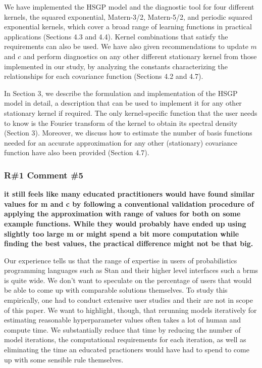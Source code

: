 \documentclass[11pt]{report}
\begin{document}
We have implemented the HSGP model and the diagnostic tool for four different kernels, the squared exponential, Matern-3/2, Matern-5/2, and periodic squared exponential kernels, which cover a broad range of learning functions in practical applications (Sections 4.3 and 4.4). Kernel combinations that satisfy the requirements can also be used. We have also given recommendations to update $m$ and $c$ and perform diagnostics on any other different stationary kernel from those implemented in our study, by analyzing the constants characterizing the relationships for each covariance function (Sections 4.2 and 4.7). 

In Section 3, we describe the formulation and implementation of the HSGP model in detail, a description that can be used to implement it for any other stationary kernel if required. The only kernel-specific function that the user needs to know is the Fourier transform of the kernel to obtain its spectral density (Section 3). Moreover, we discuss how to estimate the number of basis functions needed for an accurate approximation for any other (stationary) covariance function have also been provided (Section 4.7).


\subsubsection*{R\#1 Comment \#5}

\textbf{it still feels like many educated practitioners would have found similar values for m and c by following a conventional validation procedure of applying the approximation with range of values for both on some example functions. While they would probably have ended up using slightly too large m or might spend a bit more computation while finding the best values, the practical difference might not be that big.}

Our experience tells us that the range of expertise in users of probabilistics programming languages such as Stan and their higher level interfaces such a brms is quite wide. We don't want to speculate on the percentage of users that would be able to come up with comparable solutions themselves. To study this empirically, one had to conduct extensive user studies and their are not in scope of this paper.
We want to highlight, though, that rerunning models iteratively for estimating reasonable hyperparameter values often takes a lot of human and compute time. We substantially reduce that time by reducing the number of model iterations, the computational requirements for each iteration, as well as eliminating the time an educated practioners would have had to spend to come up with some sensible rule themselves.
\end{document}
